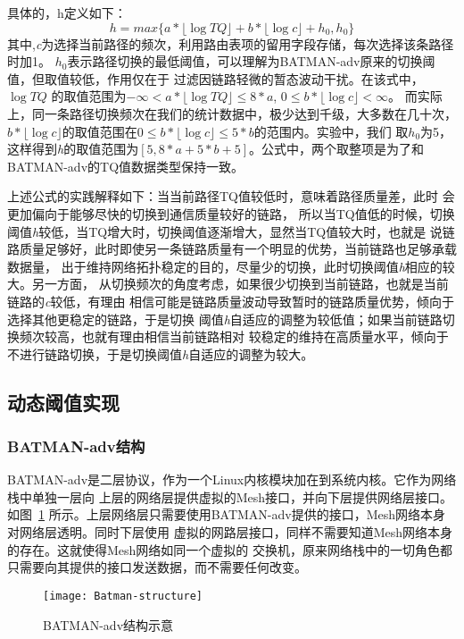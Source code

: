 具体的，h定义如下：
\begin{equation}
\label{equ:h_threshold}
h = max\{a*\lfloor\log TQ\rfloor + b*\lfloor \log c\rfloor + h_{0}, h_{0}\}
\end{equation}
其中,\emph{c}为选择当前路径的频次，利用路由表项的留用字段存储，每次选择该条路径时加1。
$h_{0}$表示路径切换的最低阈值，可以理解为BATMAN-adv原来的切换阈值，但取值较低，作用仅在于
过滤因链路轻微的暂态波动干扰。在该式中，$\log TQ$
的取值范围为$-\infty < a*\lfloor\log TQ\rfloor \leq 8*a$,
$0 \leq b*\lfloor \log c\rfloor < \infty$。
而实际上，同一条路径切换频次在我们的统计数据中，极少达到千级，大多数在几十次，
$b*\lfloor \log c\rfloor$的取值范围在$0 \leq b*\lfloor \log c\rfloor \leq 5*b$的范围内。实验中，我们
取$h_{0}$为5，这样得到\emph{h}的取值范围为$[5, 8*a+5*b+5]$。公式中，两个取整项是为了和
BATMAN-adv的TQ值数据类型保持一致。

上述公式的实践解释如下：当当前路径TQ值较低时，意味着路径质量差，此时
会更加偏向于能够尽快的切换到通信质量较好的链路，
所以当TQ值低的时候，切换阈值\emph{h}较低，当TQ增大时，切换阈值逐渐增大，显然当TQ值较大时，也就是
说链路质量足够好，此时即使另一条链路质量有一个明显的优势，当前链路也足够承载数据量，
出于维持网络拓扑稳定的目的，尽量少的切换，此时切换阈值\emph{h}相应的较大。另一方面，
从切换频次的角度考虑，如果很少切换到当前链路，也就是当前链路的\emph{c}较低，有理由
相信可能是链路质量波动导致暂时的链路质量优势，倾向于选择其他更稳定的链路，于是切换
阈值\emph{h}自适应的调整为较低值；如果当前链路切换频次较高，也就有理由相信当前链路相对
较稳定的维持在高质量水平，倾向于不进行链路切换，于是切换阈值\emph{h}自适应的调整为较大。

\subsection{动态阈值实现}
\renewcommand{\thesubsubsection}{\Alph{subsubsection}.}
\subsubsection{BATMAN-adv结构}
BATMAN-adv是二层协议，作为一个Linux内核模块加在到系统内核。它作为网络栈中单独一层向
上层的网络层提供虚拟的Mesh接口，并向下层提供网络层接口。如图~\ref{fig:batman-structure}
所示。上层网络层只需要使用BATMAN-adv提供的接口，Mesh网络本身对网络层透明。同时下层使用
虚拟的网路层接口，同样不需要知道Mesh网络本身的存在。这就使得Mesh网络如同一个虚拟的
交换机，原来网络栈中的一切角色都只需要向其提供的接口发送数据，而不需要任何改变。
\begin{figure}[H] %
  \centering
  \texttt{[image: Batman-structure]}
  \caption{BATMAN-adv结构示意}
  \label{fig:batman-structure}
\end{figure}

